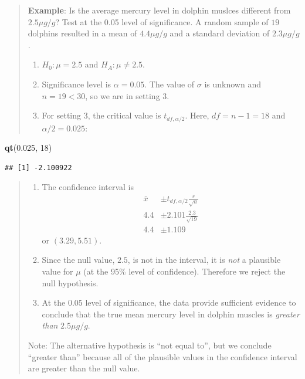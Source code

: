 \documentclass[
]{book}
\newenvironment{Shaded}{\begin{snugshade}}{\end{snugshade}}
\newcommand{\DecValTok}[1]{\textcolor[rgb]{0.00,0.00,0.81}{#1}}
\newcommand{\FloatTok}[1]{\textcolor[rgb]{0.00,0.00,0.81}{#1}}
\newcommand{\FunctionTok}[1]{\textcolor[rgb]{0.13,0.29,0.53}{\textbf{#1}}}
\newcommand{\NormalTok}[1]{#1}
\providecommand{\tightlist}{%
  \setlength{\itemsep}{0pt}\setlength{\parskip}{0pt}}
\begin{document}
\begin{quote}
\textbf{Example}: Is the average mercury level in dolphin muslces different from \(2.5\mu g/g\)? Test at the 0.05 level of significance. A random sample of \(19\) dolphins resulted in a mean of \(4.4 \mu g/g\) and a standard deviation of \(2.3 \mu g/g\).

\begin{enumerate}
\def\labelenumi{\arabic{enumi}.}
\tightlist
\item
  \(H_0: \mu = 2.5\) and \(H_A: \mu \ne 2.5\).
\item
  Significance level is \(\alpha=0.05\). The value of \(\sigma\) is unknown and \(n = 19 < 30\), so we are in setting 3.
\item
  For setting 3, the critical value is \(t_{df, \alpha/2}\). Here, \(df=n-1=18\) and \(\alpha/2 = 0.025\):
\end{enumerate}
\end{quote}

\begin{Shaded}
\begin{Highlighting}[]
\FunctionTok{qt}\NormalTok{(}\FloatTok{0.025}\NormalTok{, }\DecValTok{18}\NormalTok{)}
\end{Highlighting}
\end{Shaded}

\begin{verbatim}
## [1] -2.100922
\end{verbatim}

\begin{quote}
\begin{enumerate}
\def\labelenumi{\arabic{enumi}.}
\setcounter{enumi}{3}
\tightlist
\item
  The confidence interval is \begin{align} \bar{x} &\pm t_{df, \alpha/2}\frac{s}{\sqrt{n}} \\ 4.4 &\pm 2.101 \frac{2.3}{\sqrt{19}} \\ 4.4 &\pm 1.109 \end{align} or \((3.29, 5.51)\).
\item
  Since the null value, \(2.5\), is not in the interval, it is \emph{not} a plausible value for \(\mu\) (at the 95\% level of confidence). Therefore we reject the null hypothesis.
\item
  At the 0.05 level of significance, the data provide sufficient evidence to conclude that the true mean mercury level in dolphin muscles is \emph{greater than} \(2.5\mu g/g\).
\end{enumerate}

Note: The alternative hypothesis is ``not equal to'', but we conclude ``greater than'' because all of the plausible values in the confidence interval are greater than the null value.
\end{quote}
\end{document}
